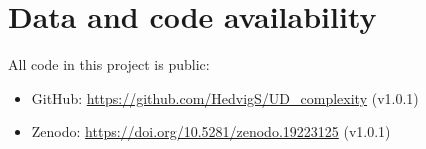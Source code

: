 \documentclass[USenglish]{article}
\begin{document}


\FloatBarrier
\newpage

\section{Data and code availability}\label{appendix_data_code}
All code in this project is public:
\begin{itemize}
    \item GitHub: \href{https://github.com/HedvigS/UD_complexity}{https://github.com/HedvigS/UD\_complexity} (v1.0.1)
    \item Zenodo: \href{https://doi.org/10.5281/zenodo.19223125}{https://doi.org/10.5281/zenodo.19223125} (v1.0.1)
\end{itemize}
\end{document}
